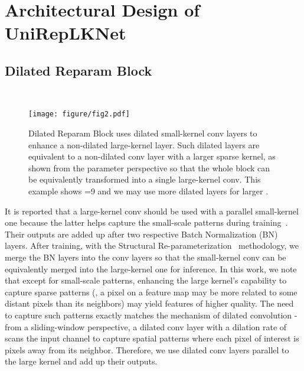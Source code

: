 \documentclass[10pt,twocolumn,letterpaper]{article}
\begin{document}
 \section{Architectural Design of UniRepLKNet}

\subsection{Dilated Reparam Block}~\label{sec-dil-reparam}

	\begin{figure*}
		\begin{center}
            \texttt{[image: figure/fig2.pdf]}
            \vspace{-0.1in}
			\caption{Dilated Reparam Block uses dilated small-kernel conv layers to enhance a non-dilated large-kernel layer. Such dilated layers are equivalent to a non-dilated conv layer with a larger sparse kernel, as shown from the parameter perspective so that the whole block can be equivalently transformed into a single large-kernel conv. This example shows =9 and we may use more dilated layers for larger .}
			\label{fig-reparam}
			\vspace{-0.25in}
		\end{center}
	\end{figure*}

It is reported that a large-kernel conv should be used with a parallel small-kernel one because the latter helps capture the small-scale patterns during training~\cite{ding2022scaling}. Their outputs are added up after two respective Batch Normalization (BN)~\cite{ioffe2015batch} layers. After training, with the Structural Re-parameterization~\cite{ding2021repvgg} methodology, we merge the BN layers into the conv layers so that the small-kernel conv can be equivalently merged into the large-kernel one for inference. In this work, we note that except for small-scale patterns, enhancing the large kernel's capability to capture sparse patterns (\ie, a pixel on a feature map may be more related to some distant pixels than its neighbors) may yield features of higher quality. The need to capture such patterns exactly matches the mechanism of dilated convolution - from a sliding-window perspective, a dilated conv layer with a dilation rate of  scans the input channel to capture spatial patterns where each pixel of interest is  pixels away from its neighbor. Therefore, we use dilated conv layers parallel to the large kernel and add up their outputs.
\end{document}
